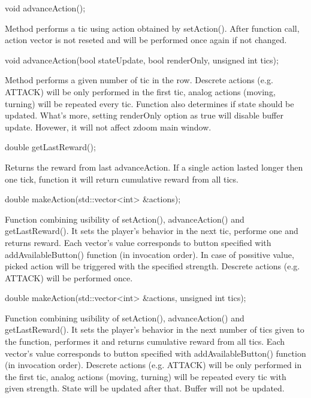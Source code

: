 \vspace{20pt}
\begin{clinee}
	void advanceAction();
\end{clinee}

Method performs a tic using action obtained by setAction(). After function call, action vector is not reseted and will be performed once again if not changed.


\vspace{20pt}
\begin{clinee}
	void advanceAction(bool stateUpdate, bool renderOnly, unsigned int tics);
\end{clinee}

Method performs a given number of tic in the row. Descrete actions (e.g. ATTACK) will be only performed in the first tic, analog actions (moving, turning) will be repeated every tic. 
Function also determines if state should be updated. What's more, setting renderOnly option as true will disable buffer update. Hovewer, it will not affect zdoom main window.  


\vspace{20pt}
\begin{clinee}
	double getLastReward();
\end{clinee}

Returns the reward from last advanceAction. If a single action lasted longer then one tick, function it will return cumulative reward from all tics.


\vspace{20pt}
\begin{clinee}
	double makeAction(std::vector<int> &actions);
\end{clinee}

Function combining usibility of setAction(), advanceAction() and getLastReward(). It sets the player's behavior in the next tic, performe one and returns reward.
Each vector's value corresponds to button specified with addAvailableButton() function (in invocation order).
In case of possitive value, picked action will be triggered with the specified strength. Descrete actions (e.g. ATTACK) will be performed once. 


\vspace{20pt}
\begin{clinee}
	double makeAction(std::vector<int> &actions, unsigned int tics);
\end{clinee}

Function combining usibility of setAction(), advanceAction() and getLastReward(). It sets the player's behavior in the next number of tics given to the function, performes it and returns cumulative reward from all tics. Each vector's value corresponds to button specified with addAvailableButton() function (in invocation order). Descrete actions (e.g. ATTACK) will be only performed in the first tic, analog actions (moving, turning) will be repeated every tic with given strength.
State will be updated after that. Buffer will not be updated.


